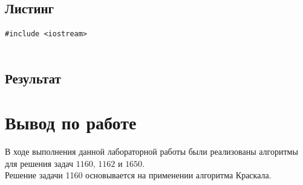 \documentclass[a5paper, 10pt]{article}
\theoremstyle{definition}
\theoremstyle{plain}
\theoremstyle{remark}
\begin{document}
\subsection{Листинг}

\begin{center}
\begin{lstlisting}[label=some-code,caption={Исходный код для 1650}]
#include <iostream>


\end{lstlisting}
\end{center}

\subsection{Результат}


\newpage
\section{Вывод по работе}
В ходе выполнения данной лабораторной работы были реализованы алгоритмы для решения задач $1160$, $1162$ и $1650$. \\

Решение задачи 1160 основывается на применении алгоритма Краскала.
\end{document}
